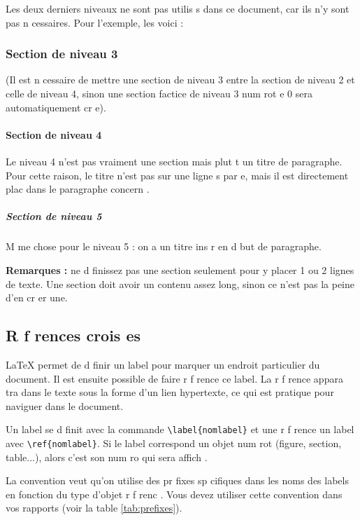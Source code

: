 \documentclass{article}
\begin{document}
Les deux derniers niveaux ne sont pas utilis s dans ce document, car ils n'y sont pas n cessaires. Pour l'exemple, les voici :
\subsubsection{Section de niveau 3}
(Il est n cessaire de mettre une section de niveau 3 entre la section de niveau 2 et celle de niveau 4, sinon une section factice de niveau 3 num rot e 0 sera automatiquement cr e).
\paragraph{Section de niveau 4}
Le niveau 4 n'est pas vraiment une section mais plut t un titre de paragraphe. Pour cette raison, le titre n'est pas sur une ligne s par e, mais il est directement plac  dans le paragraphe concern .
\subparagraph{Section de niveau 5}
M me chose pour le niveau 5 : on a un titre ins r  en d but de paragraphe.
	
\textbf{Remarques :} ne d finissez pas une section seulement pour y placer 1 ou 2 lignes de texte. Une section doit avoir un contenu assez long, sinon ce n'est pas la peine d'en cr er une.
	
\subsection{R f rences crois es}
\label{sec:references}
\LaTeX{} permet de d finir un label pour marquer un endroit particulier du document. Il est ensuite possible de faire r f rence   ce label. La r f rence appara tra dans le texte sous la forme d'un lien hypertexte, ce qui est pratique pour naviguer dans le document. 
	
Un label se d finit avec la commande \texttt{\textbackslash{}label\{nomlabel\}} et une r f rence   un label avec \texttt{\textbackslash{}ref\{nomlabel\}}. Si le label correspond   un objet num rot  (figure, section, table...), alors c'est son num ro qui sera affich .
	
La convention veut qu'on utilise des pr fixes sp cifiques dans les noms des labels en fonction du type d'objet r f renc . Vous devez utiliser cette convention dans vos rapports (voir la table \ref{tab:prefixes}).
	
\end{document}
